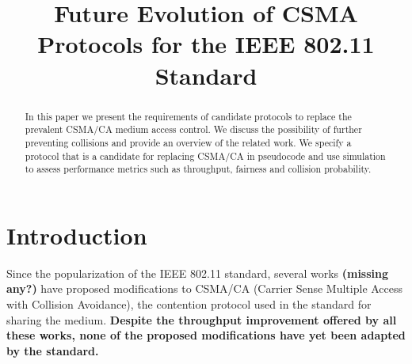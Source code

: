 \documentclass[conference]{IEEEtran}
\newcommand{\Az}[1]{{\bf{#1}}}
\begin{document}
\title{Future Evolution of CSMA Protocols for the IEEE 802.11 Standard}


\author{
}





\maketitle


\begin{abstract}
In this paper we present the requirements of candidate protocols to replace the prevalent CSMA/CA medium access control.
We discuss the possibility of further preventing collisions and provide an overview of the related work.
We specify a protocol that is a candidate for replacing CSMA/CA in pseudocode and use simulation to assess performance metrics such as throughput, fairness and collision probability.
\end{abstract}


%
\IEEEpeerreviewmaketitle



\section{Introduction}

Since the popularization of the IEEE 802.11 standard, several works \cite{bharghavan1994map,wang2004ncr,cali2000dti,lopez-toledo2006aoi,
barcelo2008lba,bellalta2009vtc,he2009srb,barcelo2010fcc,fang2011dlm,hui2011epp,barcelo2011tcf} \Az{(missing any?)} have proposed modifications to CSMA/CA (Carrier Sense Multiple Access with Collision Avoidance), the contention protocol used in the standard for sharing the medium. \Az{Despite the throughput improvement offered by all these works, none of the proposed modifications have yet been adapted by the standard.}
\end{document}
